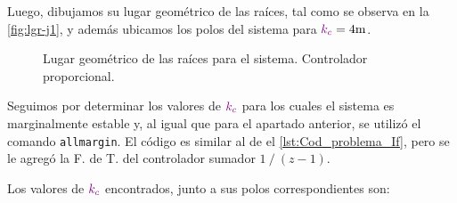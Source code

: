 Luego, dibujamos su lugar geométrico de las raíces, tal como se observa en la
\autoref{fig:lgr-j1}, y además ubicamos los polos del sistema para $\mora{k_{c}} = 4\unit{m}$.

\begin{figure}[ht]
  \centering
  
  \caption{Lugar geométrico de las raíces para el sistema. Controlador proporcional.}
  \label{fig:lgr-j1}
\end{figure}

Seguimos por determinar los valores de $\mathbin{\color{violet}k_{c}}$ para los cuales el sistema
es marginalmente estable y, al igual que para el apartado anterior, se utilizó
el comando \verb|allmargin|. El código es similar al de el \autoref{lst:Cod_problema_If},
pero se le agregó la F. de T. del controlador sumador $1 \mathbin{/} (z-1)$.

Los valores de $\mathbin{\color{violet}k_{c}}$ encontrados, junto a sus polos correspondientes son:

